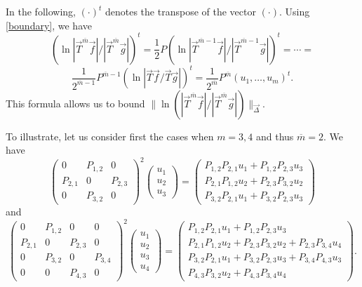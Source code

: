 \documentclass{amsart}
\numberwithin{equation}{section}
\theoremstyle{definition}
\begin{document}
In the following, $(\cdot)^t$ denotes the transpose of the vector $(\cdot)$. Using \eqref{boundary}, we have
 \[ (\ln |\vec{T}^{\overline{m}} \vec{f}|/|\vec{T}^{\overline{m}}\vec{g}|)^t = \frac{1}{2} P (\ln |\vec{T}^{\overline{m}-1} \vec{f}|/|\vec{T}^{\overline{m}-1}\vec{g}|)^t = \cdots = \]
 \[\frac{1}{2^{\overline{m}-1}} P^{\overline{m}-1} (\ln |\vec{T} \vec{f}/\vec{T}\vec{g}|)^t = \frac{1}{2^{\overline{m}}} P^{\overline{m}}(u_1,\ldots,u_m)^t.
 \]
 This formula allows us to bound $\| \ln (|\vec{T}^{\overline{m}} \vec{f}|/|\vec{T}^{\overline{m}} \vec{g}| )\|_{\vec{\Delta}}$.

To illustrate, let us consider first the cases when $m=3,4$ and thus $\overline{m}=2$. We have
\[  \left(
\begin{array}{ccc}
0 & P_{1,2} & 0 \\
P_{2,1} & 0 & P_{2,3} \\
0 & P_{3,2} & 0
\end{array}
\right)^2
\left(
\begin{array}{c}
u_1 \\
u_2 \\
u_3
\end{array}
\right) =
\left(
\begin{array}{c}
P_{1,2}P_{2,1} u_1 + P_{1,2}P_{2,3}u_3 \\
P_{2,1}P_{1,2} u_2 + P_{2,3}P_{3,2} u_2   \\
 P_{3,2}P_{2,1} u_1 + P_{3,2}P_{2,3} u_3
\end{array}
\right)
\]
and
\[  \left(
\begin{array}{cccc}
0 & P_{1,2} & 0 &0 \\
P_{2,1} & 0 & P_{2,3} &0\\
0 & P_{3,2} & 0 & P_{3,4} \\
0 & 0 & P_{4,3} & 0
\end{array}
\right)^2
\left(
\begin{array}{c}
u_1 \\
u_2 \\
u_3 \\
u_4
\end{array}
\right) =
\left(
\begin{array}{c}
P_{1,2}P_{2,1} u_1 + P_{1,2}P_{2,3}u_3 \\
P_{2,1}P_{1,2} u_2 + P_{2,3}P_{3,2} u_2   + P_{2,3}P_{3,4}u_4\\
 P_{3,2}P_{2,1} u_1 + P_{3,2}P_{2,3} u_3  + P_{3,4}P_{4,3} u_3 \\
 P_{4,3}P_{3,2} u_2 + P_{4,3}P_{3,4} u_4
\end{array}
\right).
\]
\end{document}
